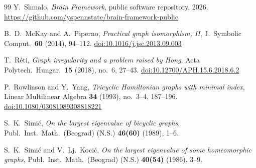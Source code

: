 \documentclass[11pt]{article}
\theoremstyle{definition}
\theoremstyle{remark}
\providecommand{\doi}[1]{\href{https://doi.org/#1}{doi:#1}}
\begin{document}
\begin{thebibliography}{99}
Y.~Shmalo, \emph{Brain Framework}, public software repository, 2026.
\url{https://github.com/yspennstate/brain-framework-public}

B.~D.~McKay and A.~Piperno, \emph{Practical graph isomorphism, II}, J.\ Symbolic Comput.\ \textbf{60} (2014), 94--112.
\doi{10.1016/j.jsc.2013.09.003}

T.~R\'eti, \emph{Graph irregularity and a problem raised by Hong}, Acta Polytech.\ Hungar.\ \textbf{15} (2018), no.~6,
27--43. \doi{10.12700/APH.15.6.2018.6.2}

P.~Rowlinson and Y.~Yang, \emph{Tricyclic Hamiltonian graphs with minimal index}, Linear Multilinear Algebra
\textbf{34} (1993), no.~3--4, 187--196. \doi{10.1080/03081089308818221}

S.~K.~Simi\'c, \emph{On the largest eigenvalue of bicyclic graphs}, Publ.\ Inst.\ Math.\ (Beograd) (N.S.)
\textbf{46(60)} (1989), 1--6.

S.~K.~Simi\'c and V.~Lj.~Koci\'c, \emph{On the largest eigenvalue of some homeomorphic graphs}, Publ.\ Inst.\ Math.\
(Beograd) (N.S.) \textbf{40(54)} (1986), 3--9.

\end{thebibliography}
\end{document}
